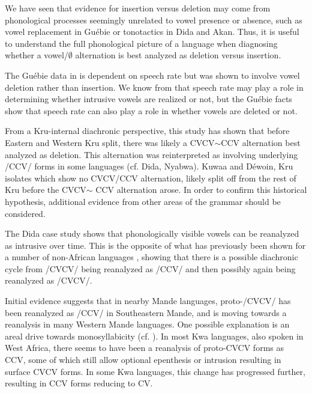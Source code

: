 \documentclass[output=paper,colorlinks,citecolor=brown]{langscibook}
\begin{document}
We have seen that evidence for insertion versus deletion may come from phonological processes seemingly unrelated to vowel presence or absence, such as vowel replacement in Guébie or tonotactics in Dida and Akan. Thus, it is useful to understand the full phonological picture of a language when diagnosing whether a vowel/$\emptyset$ alternation is best analyzed as deletion versus insertion.

The Guébie data in  is dependent on speech rate but was shown to involve vowel deletion rather than insertion. We know from \citet{Hall:2003, Hall2006} that speech rate may play a role in determining whether intrusive vowels are realized or not, but the Guébie facts show that speech rate can also play a role in whether vowels are deleted or not.

From a Kru-internal diachronic perspective, this study has shown that before Eastern and Western Kru split, there was likely a CVCV$\sim$CCV alternation best analyzed as deletion. This alternation was reinterpreted as involving underlying /CCV/ forms in some languages (cf. Dida, Nyabwa). Kuwaa and Déwoin, Kru isolates which show no CVCV\slash CCV alternation, likely split off from the rest of Kru before the CVCV$\sim$ CCV alternation arose. In order to confirm this historical hypothesis, additional evidence from other areas of the grammar should be considered.

The Dida case study shows that phonologically visible vowels can be reanalyzed as intrusive over time. This is the opposite of what has previously been shown for a number of non-African languages \citep{Harms:1976, Hall2006}, showing that there is a possible diachronic cycle from /CVCV/ being reanalyzed as /CCV/ and then possibly again being reanalyzed as /CVCV/.

Initial evidence suggests that in nearby Mande languages, proto-/CVCV/ has been reanalyzed as /CCV/ in Southeastern Mande, and is moving towards a reanalysis in many Western Mande languages. One possible explanation is an areal drive towards monosyllabicity (cf. \citealt{Green:2010, Green:2015, Green:2018}). In most Kwa languages, also spoken in West Africa, there seems to have been a reanalysis of proto-CVCV forms as CCV, some of which still allow optional epenthesis or intrusion resulting in surface CVCV forms. In some Kwa languages, this change has progressed further, resulting in CCV forms reducing to CV.


\end{document}
